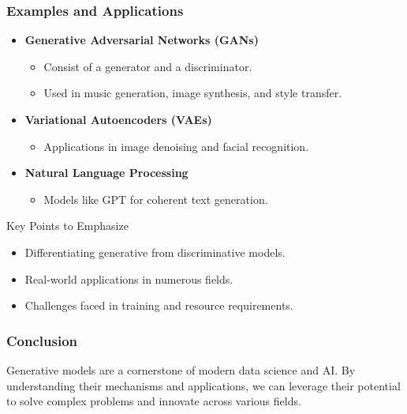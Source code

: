 \documentclass[aspectratio=169]{beamer}
\begin{document}
\begin{frame}[fragile]
    \frametitle{Examples and Applications}
    
    \begin{itemize}
        \item \textbf{Generative Adversarial Networks (GANs)}
            \begin{itemize}
                \item Consist of a generator and a discriminator.
                \item Used in music generation, image synthesis, and style transfer.
            \end{itemize}
        \item \textbf{Variational Autoencoders (VAEs)}
            \begin{itemize}
                \item Applications in image denoising and facial recognition.
            \end{itemize}
        \item \textbf{Natural Language Processing}
            \begin{itemize}
                \item Models like GPT for coherent text generation.
            \end{itemize}
    \end{itemize}
    
    \begin{block}{Key Points to Emphasize}
        \begin{itemize}
            \item Differentiating generative from discriminative models.
            \item Real-world applications in numerous fields.
            \item Challenges faced in training and resource requirements.
        \end{itemize}
    \end{block}
\end{frame}

\begin{frame}[fragile]
    \frametitle{Conclusion}
    Generative models are a cornerstone of modern data science and AI. By understanding their mechanisms and applications, we can leverage their potential to solve complex problems and innovate across various fields.
\end{frame}
\end{document}
